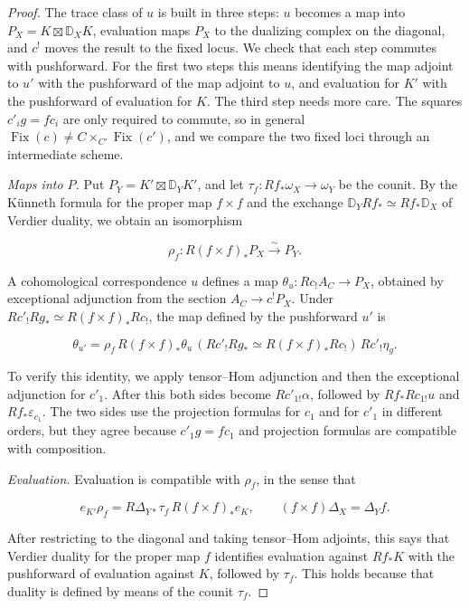 \documentclass[11pt]{article}
\providecommand{\Fix}{}\renewcommand{\Fix}{\operatorname{Fix}}
\begin{document}
\begin{proof}[{Proof}]\label{bp38}%
The trace class of \(u\) is built in three steps: \(u\) becomes a map into \(P_X=K\boxtimes\mathbb D_XK\), evaluation maps \(P_X\) to the dualizing complex on the diagonal, and \(c^!\) moves the result to the fixed locus. We check that each step commutes with pushforward. For the first two steps this means identifying the map adjoint to \(u'\) with the pushforward of the map adjoint to \(u\), and evaluation for \(K'\) with the pushforward of evaluation for \(K\). The third step needs more care. The squares \(c'_ig=fc_i\) are only required to commute, so in general \(\Fix(c)\ne C\times_{C'}\Fix(c')\), and we compare the two fixed loci through an intermediate scheme.

\emph{Maps into \(P\).} Put \(P_Y=K'\boxtimes \mathbb D_YK'\), and let \(\tau_f:Rf_*\omega_X\to\omega_Y\) be the counit. By the Künneth formula for the proper map \(f\times f\) and the exchange \(\mathbb D_YRf_*\simeq Rf_*\mathbb D_X\) of Verdier duality, we obtain an isomorphism

\[
\rho_f:R(f\times f)_*P_X\xrightarrow{\sim}P_Y.
\]

A cohomological correspondence \(u\) defines a map \(\theta_u:Rc_!A_C\to P_X\), obtained by exceptional adjunction from the section \(A_C\to c^!P_X\). Under \(Rc'_!Rg_*\simeq R(f\times f)_*Rc_!\), the map defined by the pushforward \(u'\) is

\[
\theta_{u'}=
\rho_f\,R(f\times f)_*\theta_u\,
(Rc'_!Rg_*\simeq R(f\times f)_*Rc_!)\,Rc'_!\eta_g.
\]

To verify this identity, we apply tensor–Hom adjunction and then the exceptional adjunction for \(c'_1\). After this both sides become \(Rc'_{1!}\alpha\), followed by \(Rf_*Rc_{1!}u\) and \(Rf_*\varepsilon_{c_1}\). The two sides use the projection formulas for \(c_1\) and for \(c'_1\) in different orders, but they agree because \(c'_1g=fc_1\) and projection formulas are compatible with composition.

\emph{Evaluation.} Evaluation is compatible with \(\rho_f\), in the sense that

\[
e_{K'}\rho_f=
R\Delta_{Y*}\tau_f\,R(f\times f)_*e_K,
\qquad (f\times f)\Delta_X=\Delta_Yf.
\]

After restricting to the diagonal and taking tensor–Hom adjoints, this says that Verdier duality for the proper map \(f\) identifies evaluation against \(Rf_*K\) with the pushforward of evaluation against \(K\), followed by \(\tau_f\). This holds because that duality is defined by means of the counit \(\tau_f\).


\end{proof}
\end{document}
